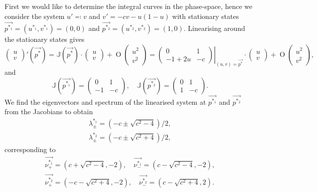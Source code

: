 First we would like to determine the integral curves in the phase-space, hence we consider the system \(u' \eqqcolon v\) 
and \(v' = -cv -u(1-u)\) with stationary states \(\vec{p^{*_1}} = (u^{*_1}, v^{*_1}) = (0,0)\) and \(\vec{p^{*_2}}
    = (u^{*_2}, v^{*_2}) = (1,0)\).
Linearising around the stationary states gives \[
    \begin{pmatrix}
        u\\v
    \end{pmatrix}'\!\!\!(\vec{p^*}) = 
    \mathbb{J}(\vec{p^*}) \cdot \begin{pmatrix} u\\v \end{pmatrix} + \mathop{O}\!\begin{pmatrix} u^2 \\ v^2
    \end{pmatrix}=
    \left.\begin{pmatrix} 0 & 1 \\ -1 + 2u & -c \end{pmatrix}\right|_{(u,v) = \vec{p^*}}\cdot\begin{pmatrix} u\\v \end{pmatrix}
        + \mathop{O}\!\begin{pmatrix} u^2 \\ v^2
    \end{pmatrix},
\] and \[
\mathbb{J}(\vec{p^{*_1}}) = \begin{pmatrix}
    0 & 1 \\ -1 & -c
\end{pmatrix}, \quad 
\mathbb{J}(\vec{p^{*_2}}) = \begin{pmatrix}
    0 & 1 \\ 1 & -c
\end{pmatrix}.
\] 
We find the eigenvectors and spectrum of the linearised system at \(\vec{p^{*_1}}\) and \(\vec{p^{*_2}}\) from the 
    Jacobians to obtain \begin{equation}
        \label{eq:eigenvalues-kkp-fisher}
        \begin{gathered}
            \lambda_{\pm}^{*_1} = (-c \pm \sqrt{c^2 - 4})/2, \\
            \lambda_{\pm}^{*_2} = (-c \pm \sqrt{c^2 + 4})/2,
        \end{gathered}
    \end{equation}
    corresponding to
    \begin{equation*}
        \begin{gathered}
            \vec{\nu_{+}^{*_1}} = (c + \sqrt{c^2 - 4}, -2), \quad\vec{\nu_{-}^{*_1}} = (c - \sqrt{c^2 - 4}, -2),\\
            \vec{\nu_{+}^{*_2}} = (-c - \sqrt{c^2 + 4}, -2),\quad \vec{\nu_{-}^{*_2}} = (c - \sqrt{c^2 + 4}, 2).
        \end{gathered}
    \end{equation*}
